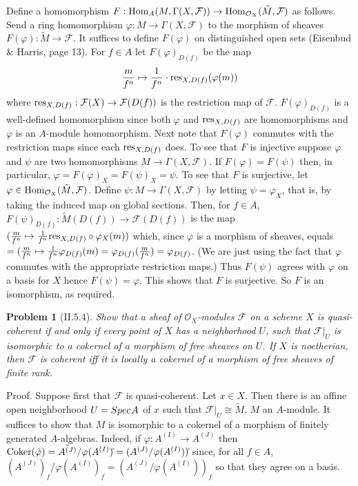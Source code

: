 \documentclass[12pt]{article}
\newcommand{\sox}{\mathcal{O}_X}
\renewcommand{\sf}{\mathcal{F}}
\renewcommand{\hom}{\mbox{\rm Hom}}
\newcommand{\isom}{\cong}
\newcommand{\into}{\rightarrow}
\newcommand{\res}{\mbox{\rm res}}
\newcommand{\coker}{\mbox{\rm Coker}}
\newtheorem{prob}{Problem}
\renewcommand{\phi}{\varphi}
\newcommand{\spec}{Spec \hspace{.01in}}
\newcommand{\proof}{\mbox{\sc Proof.\hspace{.1in}}}
\begin{document}
Define a homomorphism $F:\hom_A(M,\Gamma(X,\sf))\into
\hom_{\sox}(\tilde{M},\sf)$ as follows. Send
a ring homomorphism $\phi:M\into\Gamma(X,\sf)$
to the morphism of sheaves $F(\phi):\tilde{M}\into\sf$.
It suffices to define $F(\phi)$ on distinguished
open sets (Eisenbud \& Harris, page 13). 
For $f\in A$ let $F(\phi)_{D(f)}$ be the map
$${m\over f^n}\mapsto {1\over f^n}
\cdot\res_{X,D(f)}(\phi(m))$$
where $\res_{X,D(f)}:\sf(X)\into\sf(D(f))$ 
is the restriction map of $\sf$. 
$F(\phi)_{D(f)}$ is a well-defined homomorphism since
both $\phi$ and $\res_{X,D(f)}$ are homomorphisms and 
$\phi$ is an $A$-module homomorphism. Next note 
that $F(\phi)$ commutes with the
restriction maps since each $\res_{X,D(f)}$ does. 
To see that $F$ is injective suppose $\phi$ and
$\psi$ are two homomorphisms $M\into\Gamma(X,\sf)$.
If $F(\phi)=F(\psi)$ then, in particular,
$\phi=F(\phi)_{X}=F(\psi)_{X}=\psi$.
To see that $F$ is surjective, let $\phi\in\hom_{\sox}
(\tilde{M},\sf)$. Define $\psi:M\into\Gamma(X,\sf)$
by letting $\psi=\phi_X$, that is, by taking the 
induced map on global sections. 
Then, for $f\in A$, 
$F(\psi)_{D(f)}:\tilde{M}(D(f))\into\sf(D(f))$ is
the map
$({m\over f^n}\mapsto {1\over f^n}\res_{X,D(f)}\circ\phi_X(m))$
which, since $\phi$ is a morphism of sheaves, equals
$=({m\over f^n}\mapsto {1\over f^n}\phi_{D(f)}(m)
=\phi_{D(f)}({m\over f^n})=\phi_{D(f)}$.
(We are just using the fact that $\phi$ commutes with
the appropriate restriction maps.)
Thus $F(\psi)$ agrees with $\phi$ on a basis for $X$
hence $F(\psi)=\phi$. This shows that $F$ is surjective.
So $F$ is an isomorphism, as required.

\begin{prob}[II.5.4]
Show that a sheaf of $\sox$-modules $\sf$ on a scheme $X$ 
is quasi-coherent
if and only if every point of $X$ has a neighborhood $U$, such
that $\sf|_{U}$ is isomorphic to a cokernel of a morphism of
free sheaves on $U$. If $X$ is noetherian, then $\sf$ is coherent
iff it is locally a cokernel of a morphism of free sheaves
of finite rank.
\end{prob}
\proof
Suppose first that $\sf$ is quasi-coherent. Let $x\in X$. 
Then there is an affine open neighborhood
$U=\spec A$ of $x$ such that $\sf|_U\isom \tilde{M}$,
$M$ an $A$-module. It suffices to show that $M$ is
isomorphic to a cokernel of a morphism of finitely
generated $A$-algebras. Indeed, if 
$\phi:A^{(I)}\into A^{(J)}$ then 
$\coker(\tilde{\phi})=\tilde{A^{(J)}}/\phi(A^{(I)})\tilde{}
=(A^{(J)}/\phi(A^{(I)}))\tilde{}$
since, for all $f\in A$, 
$(A^{(J)})_f/\phi(A^{(I)})_f
=(A^{(J)}/\phi(A^{(I)}))_f$
so that they agree on a basis. 
\end{document}
